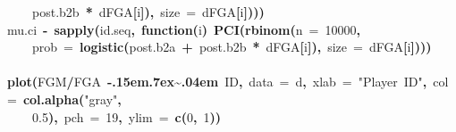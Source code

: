 \documentclass{article}
\makeatletter
\newcommand{\hlnumber}[1]{\textcolor[rgb]{0,0,0}{#1}}%
\newcommand{\hlfunctioncall}[1]{\textcolor[rgb]{.5,0,.33}{\textbf{#1}}}%
\newcommand{\hlstring}[1]{\textcolor[rgb]{.6,.6,1}{#1}}%
\newcommand{\hlkeyword}[1]{\textbf{#1}}%
\newcommand{\hlargument}[1]{\textcolor[rgb]{.69,.25,.02}{#1}}%
\newcommand{\hlformalargs}[1]{\hlargument{#1}}%
\newcommand{\hlassignement}[1]{\textbf{#1}}%
\newcommand{\hlsymbol}[1]{#1}%
\def\urltilda{\kern -.15em\lower .7ex\hbox{\~{}}\kern .04em}%
\newcommand{\hlstd}[1]{\textcolor[rgb]{0,0,0}{#1}}%
\newenvironment{kframe}{%
 \def\FrameCommand##1{\hskip\@totalleftmargin \hskip-\fboxsep
 \colorbox{shadecolor}{##1}\hskip-\fboxsep
     \hskip-\linewidth \hskip-\@totalleftmargin \hskip\columnwidth}%
 \MakeFramed {\advance\hsize-\width
   \@totalleftmargin\z@ \linewidth\hsize
   \@setminipage}}%
 {\par\unskip\endMakeFramed}
\newenvironment{knitrout}{}{} %
\makeatother
\begin{document}
\begin{knitrout}
{\begin{kframe}
\begin{flushleft}
\hlstd{}{\ }{\ }{\ }{\ }\hlsymbol{post.b2}\hlkeyword{\usebox{\hlnormalsizeboxdollar}}\hlsymbol{b}{\ }\hlkeyword{*}{\ }\hlsymbol{d}\hlkeyword{\usebox{\hlnormalsizeboxdollar}}\hlsymbol{FGA}\hlkeyword{[}\hlsymbol{i}\hlkeyword{]}\hlkeyword{)}\hlkeyword{,}{\ }\hlargument{size}{\ }\hlargument{=}{\ }\hlsymbol{d}\hlkeyword{\usebox{\hlnormalsizeboxdollar}}\hlsymbol{FGA}\hlkeyword{[}\hlsymbol{i}\hlkeyword{]}\hlkeyword{)}\hlkeyword{)}\hlkeyword{)}\hspace*{\fill}\\
\hlstd{}\hlsymbol{mu.ci}{\ }\hlassignement{\usebox{\hlnormalsizeboxlessthan}-}{\ }\hlfunctioncall{sapply}\hlkeyword{(}\hlsymbol{id.seq}\hlkeyword{,}{\ }\hlkeyword{function}\hlkeyword{(}\hlformalargs{i}\hlkeyword{)}{\ }\hlfunctioncall{PCI}\hlkeyword{(}\hlfunctioncall{rbinom}\hlkeyword{(}\hlargument{n}{\ }\hlargument{=}{\ }\hlnumber{10000}\hlkeyword{,}\hspace*{\fill}\\
\hlstd{}{\ }{\ }{\ }{\ }\hlargument{prob}{\ }\hlargument{=}{\ }\hlfunctioncall{logistic}\hlkeyword{(}\hlsymbol{post.b2}\hlkeyword{\usebox{\hlnormalsizeboxdollar}}\hlsymbol{a}{\ }\hlkeyword{+}{\ }\hlsymbol{post.b2}\hlkeyword{\usebox{\hlnormalsizeboxdollar}}\hlsymbol{b}{\ }\hlkeyword{*}{\ }\hlsymbol{d}\hlkeyword{\usebox{\hlnormalsizeboxdollar}}\hlsymbol{FGA}\hlkeyword{[}\hlsymbol{i}\hlkeyword{]}\hlkeyword{)}\hlkeyword{,}{\ }\hlargument{size}{\ }\hlargument{=}{\ }\hlsymbol{d}\hlkeyword{\usebox{\hlnormalsizeboxdollar}}\hlsymbol{FGA}\hlkeyword{[}\hlsymbol{i}\hlkeyword{]}\hlkeyword{)}\hlkeyword{)}\hlkeyword{)}\hspace*{\fill}\\
\hlstd{}\hspace*{\fill}\\
\hlstd{}\hlfunctioncall{plot}\hlkeyword{(}\hlsymbol{FGM}\hlkeyword{/}\hlsymbol{FGA}{\ }\hlkeyword{\urltilda{}}{\ }\hlsymbol{ID}\hlkeyword{,}{\ }\hlargument{data}{\ }\hlargument{=}{\ }\hlsymbol{d}\hlkeyword{,}{\ }\hlargument{xlab}{\ }\hlargument{=}{\ }\hlstring{"Player{\ }ID"}\hlkeyword{,}{\ }\hlargument{col}{\ }\hlargument{=}{\ }\hlfunctioncall{col.alpha}\hlkeyword{(}\hlstring{"gray"}\hlkeyword{,}\hspace*{\fill}\\
\hlstd{}{\ }{\ }{\ }{\ }\hlnumber{0.5}\hlkeyword{)}\hlkeyword{,}{\ }\hlargument{pch}{\ }\hlargument{=}{\ }\hlnumber{19}\hlkeyword{,}{\ }\hlargument{ylim}{\ }\hlargument{=}{\ }\hlfunctioncall{c}\hlkeyword{(}\hlnumber{0}\hlkeyword{,}{\ }\hlnumber{1}\hlkeyword{)}\hlkeyword{)}\hspace*{\fill}\\

\end{flushleft}
\end{kframe}}
\end{knitrout}
\end{document}
